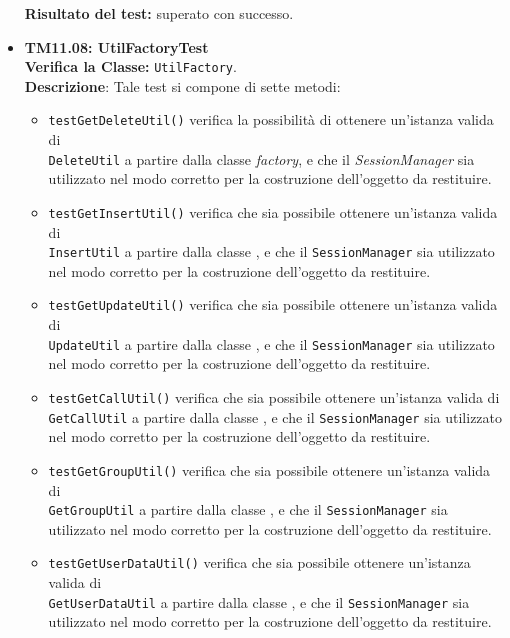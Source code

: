 \begin{itemize}
\begin{itemize}
\end{itemize}
\textbf{Risultato del test:} superato con successo.

\item \textbf{TM11.08: UtilFactoryTest}\\
\textbf{Verifica la Classe:} \texttt{UtilFactory}.\\
\textbf{Descrizione}: %
Tale test si compone di sette metodi:
\begin{itemize}
\item \texttt{testGetDeleteUtil()} verifica la possibilità di ottenere un'istanza valida di \\ \texttt{DeleteUtil} a partire dalla classe \textit{factory}, e che il \textit{SessionManager} sia utilizzato nel modo corretto per la costruzione dell'oggetto da restituire.

\item \texttt{testGetInsertUtil()} verifica che sia possibile ottenere un'istanza valida di \\ \texttt{InsertUtil} a partire dalla classe , e che il \texttt{SessionManager} sia utilizzato nel modo corretto per la costruzione dell'oggetto da restituire.

\item \texttt{testGetUpdateUtil()} verifica che sia possibile ottenere un'istanza valida di \\ \texttt{UpdateUtil} a partire dalla classe , e che il \texttt{SessionManager} sia utilizzato nel modo corretto per la costruzione dell'oggetto da restituire.

\item \texttt{testGetCallUtil()} verifica che sia possibile ottenere un'istanza valida di \\ \texttt{GetCallUtil} a partire dalla classe , e che il \texttt{SessionManager} sia utilizzato nel modo corretto per la costruzione dell'oggetto da restituire.

\item \texttt{testGetGroupUtil()} verifica che sia possibile ottenere un'istanza valida di \\ \texttt{GetGroupUtil} a partire dalla classe , e che il \texttt{SessionManager} sia utilizzato nel modo corretto per la costruzione dell'oggetto da restituire.

\item \texttt{testGetUserDataUtil()} verifica che sia possibile ottenere un'istanza valida di \\ \texttt{GetUserDataUtil} a partire dalla classe , e che il \texttt{SessionManager} sia utilizzato nel modo corretto per la costruzione dell'oggetto da restituire.


\end{itemize}
\end{itemize}
